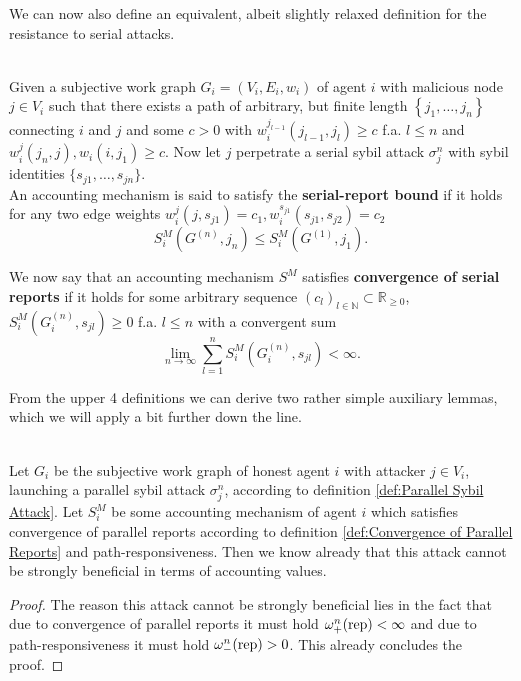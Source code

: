 \noindent{}We can now also define an equivalent, albeit slightly relaxed definition for the resistance to serial attacks. \vspace{1em}\\

\begin{definition}\ \\
\label{def:Convergence of Serial Reports}
Given a subjective work graph $G_i=(V_i,E_i,w_i)$ of agent $i$ with malicious node $j\in{}V_i$ such that there exists a path of arbitrary, but finite length $\left\lbrace{}j_1,\ldots,j_n\right\rbrace$ connecting $i$ and $j$ and some $c>0$ with $w_i^{j_{l-1}}(j_{l-1},j_l)\geq{}c$ f.a. $l\leq{}n$ and $w_i^j(j_n,j),w_i(i,j_1)\geq{}c$. Now let $j$ perpetrate a serial sybil attack $\sigma_j^n$ with sybil identities $\lbrace{}s_{j1},\ldots,s_{jn}\rbrace$. \vspace{1em}\\

\noindent{}An accounting mechanism is said to satisfy the \textbf{serial-report bound} if it holds for any two edge weights $w^j_i(j,s_{j1})=c_1, w_i^{s_{j1}}(s_{j1},s_{j2})=c_2$
\[
S^M_i(G^{(n)},j_n)\leq{}S^M_i(G^{(1)},j_1).
\]

\noindent{}We now say that an accounting mechanism $S^M$ satisfies \textbf{convergence of serial reports} if it holds for some arbitrary sequence $(c_l)_{l\in\mathbb{N}}\subset\mathbb{R}_{\geq{}0}$, $S^M_i(G^{(n)}_i,s_{jl})\geq{}0$ f.a. $l\leq{}n$ with a convergent sum 
\[
\lim\limits_{n\rightarrow\infty}\sum\limits_{l=1}^{n}S^M_i(G^{(n)}_i,s_{jl})<\infty.
\]
\end{definition}

\noindent{}From the upper 4 definitions we can derive two rather simple auxiliary lemmas, which we will apply a bit further down the line.\vspace{1em}\\

\begin{lemma}[]\ \\
\label{lem:Sybil-proofness Against Parallel Attacks}
\noindent{}Let $G_i$ be the subjective work graph of honest agent $i$ with attacker $j\in{}V_i$, launching a parallel sybil attack $\sigma_j^n$, according to definition \ref{def:Parallel Sybil Attack}. Let $S_i^M$ be some accounting mechanism of agent $i$ which satisfies convergence of parallel reports according to definition \ref{def:Convergence of Parallel Reports} and path-responsiveness. Then we know already that this attack cannot be strongly beneficial in terms of accounting values. 
\end{lemma} 
\begin{proof}
\noindent{}The reason this attack cannot be strongly beneficial lies in the fact that due to convergence of parallel reports it must hold $\omega_{+}^n({\rm rep})<\infty$ and due to path-responsiveness it must hold $\omega_{-}^n({\rm rep})>0$. This already concludes the proof.
\end{proof}

